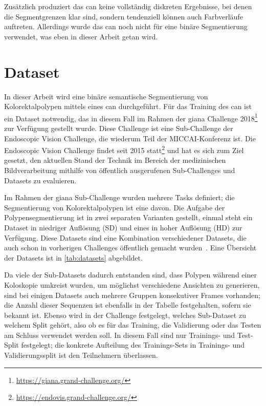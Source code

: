Zusätzlich produziert das \gls{can} keine vollständig diskreten Ergebnisse, bei denen die Segmentgrenzen klar sind, sondern tendenziell können auch Farbverläufe auftreten.
Allerdings wurde das \gls{can} noch nicht für eine binäre Segmentierung verwendet, was eben in dieser Arbeit getan wird.



\section{Dataset}

In dieser Arbeit wird eine binäre semantische Segmentierung von Kolorektalpolypen mittels eines \gls{can} durchgeführt.
Für das Training des \gls{can} ist ein Dataset notwendig, das in diesem Fall im Rahmen der \gls{giana} Challenge 2018\footnote{\url{https://giana.grand-challenge.org/}} zur Verfügung gestellt wurde.
Diese Challenge ist eine Sub-Challenge der Endoscopic Vision Challenge, die wiederum Teil der MICCAI-Konferenz ist.
Die Endoscopic Vision Challenge findet seit 2015 statt\footnote{\url{https://endovis.grand-challenge.org/}} und hat es sich zum Ziel gesetzt, den aktuellen Stand der Technik im Bereich der medizinischen Bildverarbeitung mithilfe von öffentlich ausgerufenen Sub-Challenges und Datasets zu evaluieren.

Im Rahmen der \gls{giana} Sub-Challenge wurden mehrere Tasks definiert; die Segmentierung von Kolorektalpolypen ist eine davon.
Die Aufgabe der Polypensegmentierung ist in zwei separaten Varianten gestellt, einmal steht ein Dataset in niedriger Auflösung (SD) und eines in hoher Auflösung (HD) zur Verfügung.
Diese Datasets sind eine Kombination verschiedener Datasets, die auch schon in vorherigen Challenges öffentlich gemacht wurden~\cite{Bernal.2012,Bernal.2015,Vazquez.2017}.
Eine Übersicht der Datasets ist in \autoref{tab:datasets} abgebildet.

Da viele der Sub-Datasets dadurch entstanden sind, dass Polypen während einer Koloskopie umkreist wurden, um möglichst verschiedene Ansichten zu generieren, sind bei einigen Datasets auch mehrere Gruppen konsekutiver Frames vorhanden; die Anzahl dieser Sequenzen ist ebenfalls in der Tabelle festgehalten, sofern sie bekannt ist.
Ebenso wird in der Challenge festgelegt, welches Sub-Dataset zu welchem Split gehört, also ob es für das Training, die Validierung oder das Testen am Schluss verwendet werden soll.
In diesem Fall sind nur Trainings- und Test-Split festgelegt; die konkrete Aufteilung des Trainings-Sets in Trainings- und Validierungssplit ist den Teilnehmern überlassen.

